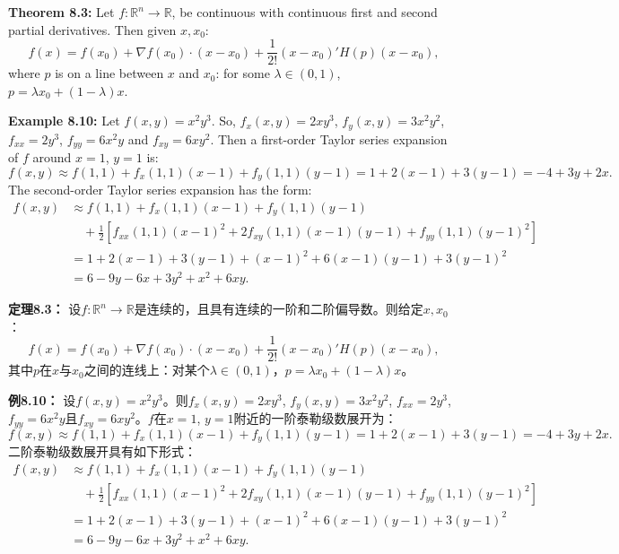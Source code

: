 \begin{original}
\textbf{Theorem 8.3:} Let $f : \mathbb{R}^n \to \mathbb{R}$, be continuous with continuous first and second partial derivatives. Then given $x, x_0$:
\[
f(x) = f(x_0) + \nabla f(x_0) \cdot (x - x_0) + \frac{1}{2!}(x - x_0)' H(p)(x - x_0),
\]
where $p$ is on a line between $x$ and $x_0$: for some $\lambda \in (0,1)$, $p = \lambda x_0 + (1-\lambda)x$.

\textbf{Example 8.10:} Let $f(x, y) = x^2 y^3$. So, $f_x(x, y) = 2x y^3$, $f_y(x, y) = 3x^2 y^2$, $f_{xx} = 2y^3$, $f_{yy} = 6x^2 y$ and $f_{xy} = 6x y^2$. Then a first-order Taylor series expansion of $f$ around $x = 1$, $y = 1$ is:
\[
f(x, y) \approx f(1,1) + f_x(1,1)(x-1) + f_y(1,1)(y-1) = 1 + 2(x-1) + 3(y-1) = -4 + 3y + 2x.
\]
The second-order Taylor series expansion has the form:
\begin{align*}
f(x, y) &\approx f(1,1) + f_x(1,1)(x-1) + f_y(1,1)(y-1) \\
&\quad + \frac{1}{2}[f_{xx}(1,1)(x-1)^2 + 2f_{xy}(1,1)(x-1)(y-1) + f_{yy}(1,1)(y-1)^2]\\
&= 1 + 2(x-1) + 3(y-1) + (x-1)^2 + 6(x-1)(y-1) + 3(y-1)^2\\
&= 6 - 9y - 6x + 3y^2 + x^2 + 6xy.
\end{align*}
\end{original}
\begin{translation}
\textbf{定理8.3：} 设$f : \mathbb{R}^n \to \mathbb{R}$是连续的，且具有连续的一阶和二阶偏导数。则给定$x, x_0$：
\[
f(x) = f(x_0) + \nabla f(x_0) \cdot (x - x_0) + \frac{1}{2!}(x - x_0)' H(p)(x - x_0),
\]
其中$p$在$x$与$x_0$之间的连线上：对某个$\lambda \in (0,1)$，$p = \lambda x_0 + (1-\lambda)x$。

\textbf{例8.10：} 设$f(x, y) = x^2 y^3$。则$f_x(x, y) = 2x y^3$, $f_y(x, y) = 3x^2 y^2$, $f_{xx} = 2y^3$, $f_{yy} = 6x^2 y$且$f_{xy} = 6x y^2$。$f$在$x = 1$, $y = 1$附近的一阶泰勒级数展开为：
\[
f(x, y) \approx f(1,1) + f_x(1,1)(x-1) + f_y(1,1)(y-1) = 1 + 2(x-1) + 3(y-1) = -4 + 3y + 2x.
\]
二阶泰勒级数展开具有如下形式：
\begin{align*}
f(x, y) &\approx f(1,1) + f_x(1,1)(x-1) + f_y(1,1)(y-1) \\
&\quad + \frac{1}{2}[f_{xx}(1,1)(x-1)^2 + 2f_{xy}(1,1)(x-1)(y-1) + f_{yy}(1,1)(y-1)^2]\\
&= 1 + 2(x-1) + 3(y-1) + (x-1)^2 + 6(x-1)(y-1) + 3(y-1)^2\\
&= 6 - 9y - 6x + 3y^2 + x^2 + 6xy.
\end{align*}
\end{translation}

